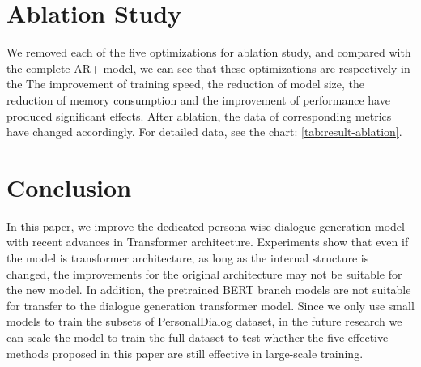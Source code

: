\documentclass[letterpaper]{article} %
\begin{document}
\section[Ablation Study]{Ablation Study} 
We removed each of the five optimizations for ablation study, and compared with the complete AR+ model, we can see that these optimizations are respectively in the The improvement of training speed, the reduction of model size, the reduction of memory consumption and the improvement of performance have produced significant effects. After ablation, the data of corresponding metrics have changed accordingly. For detailed data, see the chart: \ref{tab:result-ablation}.
 
\begin{table*} [b]
\centering
\caption{Ablation study results, bold data is degradation metric}
\label{tab:result-ablation}
\end{table*}
                     

\section[Conclusion]{Conclusion} 
In this paper, we improve the dedicated persona-wise dialogue generation model with recent advances in Transformer architecture. Experiments show that even if the model is transformer architecture, as long as the internal structure is changed, the improvements for the original architecture may not be suitable for the new model. In addition, the pretrained BERT branch models are not suitable for transfer to the dialogue generation transformer model. Since we only use small models to train the subsets of PersonalDialog dataset, in the future research we can scale the model to train the full dataset to test whether the five effective methods proposed in this paper are still effective in large-scale training. 




\end{document}
